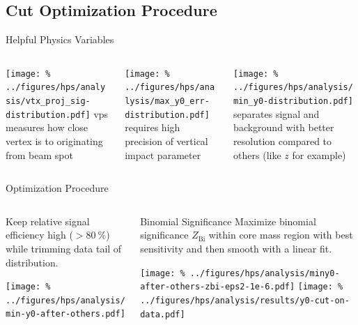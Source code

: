 \documentclass[aspectratio=169]{beamer}
\begin{document}
\subsection{Cut Optimization Procedure}
\begin{frame}{Helpful Physics Variables}
  \begin{columns}
    \begin{column}{0.3\textwidth}
      \texttt{[image: \%
        ../figures/hps/analysis/vtx\_proj\_sig-distribution.pdf]}
      \ac{vps} measures how close vertex
      is to originating from beam spot
    \end{column}
    \begin{column}{0.3\textwidth}
      \texttt{[image: \%
        ../figures/hps/analysis/max\_y0\_err-distribution.pdf]}
      \maxyzeroerr requires high precision
      of vertical impact parameter
    \end{column}
    \begin{column}{0.3\textwidth}
      \texttt{[image: \%
        ../figures/hps/analysis/min\_y0-distribution.pdf]}
      \minyzero separates signal and background
      with better resolution compared to others
      (like $z$ for example)
    \end{column}
  \end{columns}
\end{frame}


\begin{frame}{Optimization Procedure}
  \begin{columns}
    \begin{column}{0.3\textwidth}
      {Keep relative signal efficiency high ($> \qty{80}{\%}$)
      while trimming data tail of \minyzero distribution.}
      
      \vfill

      {
      \texttt{[image: \%
        ../figures/hps/analysis/min-y0-after-others.pdf]}
      }
    \end{column}
    \begin{column}{0.69\textwidth}
      \begin{block}{Binomial Significance}
        Maximize binomial significance $Z_\mathrm{Bi}$
        within core mass region with best sensitivity
        and then smooth with a linear fit.
      \end{block}
      \texttt{[image: \%
        ../figures/hps/analysis/miny0-after-others-zbi-eps2-1e-6.pdf]}
      \texttt{[image: \%
        ../figures/hps/analysis/results/y0-cut-on-data.pdf]}
    \end{column}
  \end{columns}
\end{frame}
\end{document}
